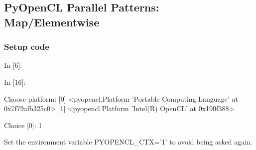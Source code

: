 
    
    \hypertarget{pyopencl-parallel-patterns-mapelementwise}{%
\subsection{PyOpenCL Parallel Patterns:
Map/Elementwise}\label{pyopencl-parallel-patterns-mapelementwise}}

    \hypertarget{setup-code}{%
\subsubsection{Setup code}\label{setup-code}}

    \begin{BGVerbatim}[commandchars=\\\{\}]
{\color{incolor}In [{\color{incolor}6}]:}    
         
         
           
\end{BGVerbatim}

    \begin{BGVerbatim}[commandchars=\\\{\}]
{\color{incolor}In [{\color{incolor}16}]:}   
           
\end{BGVerbatim}

    \begin{BGVerbatim}[commandchars=\\\{\}]
Choose platform:
[0] <pyopencl.Platform 'Portable Computing Language' at 0x7f79afb325c0>
[1] <pyopencl.Platform 'Intel(R) OpenCL' at 0x190f388>

    \end{BGVerbatim}

    \begin{BGVerbatim}[commandchars=\\\{\}]
Choice [0]: 1

    \end{BGVerbatim}

    \begin{BGVerbatim}[commandchars=\\\{\}]
Set the environment variable PYOPENCL\_CTX='1' to avoid being asked again.

    \end{BGVerbatim}


